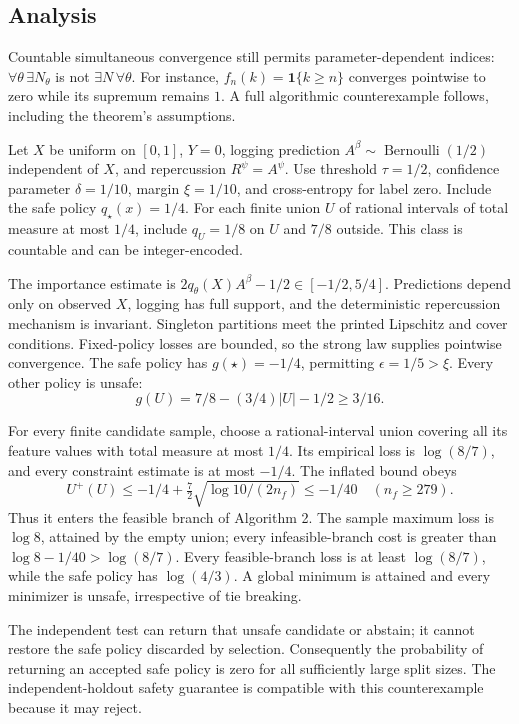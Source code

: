 \documentclass[11pt]{article}
\begin{document}
\subsection*{Analysis}

Countable simultaneous convergence still permits parameter-dependent indices: \(\forall\theta\,\exists N_\theta\) is not \(\exists N\,\forall\theta\). For instance, \(f_n(k)=\mathbf1\{k\geq n\}\) converges pointwise to zero while its supremum remains \(1\). A full algorithmic counterexample follows, including the theorem’s assumptions.

Let \(X\) be uniform on \([0,1]\), \(Y=0\), logging prediction \(A^\beta\sim\operatorname{Bernoulli}(1/2)\) independent of \(X\), and repercussion \(R^\psi=A^\psi\). Use threshold \(\tau=1/2\), confidence parameter \(\delta=1/10\), margin \(\xi=1/10\), and cross-entropy for label zero. Include the safe policy \(q_\star(x)=1/4\). For each finite union \(U\) of rational intervals of total measure at most \(1/4\), include \(q_U=1/8\) on \(U\) and \(7/8\) outside. This class is countable and can be integer-encoded.

The importance estimate is \(2q_\theta(X)A^\beta-1/2\in[-1/2,5/4]\). Predictions depend only on observed \(X\), logging has full support, and the deterministic repercussion mechanism is invariant. Singleton partitions meet the printed Lipschitz and cover conditions. Fixed-policy losses are bounded, so the strong law supplies pointwise convergence. The safe policy has \(g(\star)=-1/4\), permitting \(\epsilon=1/5>\xi\). Every other policy is unsafe: \[g(U)=7/8-(3/4)|U|-1/2\geq3/16.\]

For every finite candidate sample, choose a rational-interval union covering all its feature values with total measure at most \(1/4\). Its empirical loss is \(\log(8/7)\), and every constraint estimate is at most \(-1/4\). The inflated bound obeys \[U^+(U)\leq-1/4+\tfrac72\sqrt{\log10/(2n_f)}\leq-1/40\quad(n_f\geq279).\] Thus it enters the feasible branch of Algorithm 2. The sample maximum loss is \(\log8\), attained by the empty union; every infeasible-branch cost is greater than \(\log8-1/40>\log(8/7)\). Every feasible-branch loss is at least \(\log(8/7)\), while the safe policy has \(\log(4/3)\). A global minimum is attained and every minimizer is unsafe, irrespective of tie breaking.

The independent test can return that unsafe candidate or abstain; it cannot restore the safe policy discarded by selection. Consequently the probability of returning an accepted safe policy is zero for all sufficiently large split sizes. The independent-holdout safety guarantee is compatible with this counterexample because it may reject.
\end{document}
